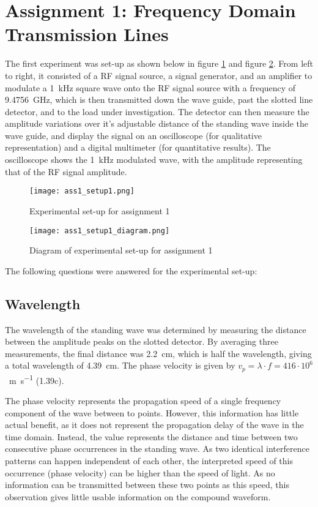 \section*{Assignment 1: Frequency Domain Transmission Lines}

The first experiment was set-up as shown below in figure \ref{fig:setup_1} and figure \ref{fig:setup_1_diagram}. From left to right, it consisted of a RF signal source, a signal generator, and an amplifier to modulate a \SI{1}{\kilo\hertz} square wave onto the RF signal source with a frequency of \SI{9.4756}{\giga\hertz}, which is then transmitted down the wave guide, past the slotted line detector, and to the load under investigation. The detector can then measure the amplitude variations over it's adjustable distance of the standing wave inside the wave guide, and display the signal on an oscilloscope (for qualitative representation) and a digital multimeter (for quantitative results). The oscilloscope shows the \SI{1}{\kilo\hertz} modulated wave, with the amplitude representing that of the RF signal amplitude.

\begin{figure}[H]
	\centering
	\texttt{[image: ass1\_setup1.png]}
	\caption{Experimental set-up for assignment 1 \cite[p.3]{lab_manual}}
	\label{fig:setup_1}
\end{figure}

\begin{figure}[H]
	\centering
	\texttt{[image: ass1\_setup1\_diagram.png]}
	\caption{Diagram of experimental set-up for assignment 1}
	\label{fig:setup_1_diagram}
\end{figure}

The following questions were answered for the experimental set-up:

\subsection*{Wavelength}
The wavelength of the standing wave was determined by measuring the distance between the amplitude peaks on the slotted detector. By averaging three measurements, the final distance was \SI{2.2}{\centi\meter}, which is half the wavelength, giving a total wavelength of \SI{4.39}{\centi\meter}. The phase velocity is given by $v_{p} = \lambda \cdot f = 416 \cdot 10^6$ \SI {}{\meter\per\second} (1.39c).

The phase velocity represents the propagation speed of a single frequency component of the wave between to points. However, this information has little actual benefit, as it does not represent the propagation delay of the wave in the time domain. Instead, the value represents the distance and time between two consecutive phase occurrences in the standing wave. As two identical interference patterns can happen independent of each other, the interpreted speed of this occurrence (phase velocity) can be higher than the speed of light. As no information can be transmitted between these two points as this speed, this observation gives little usable information on the compound waveform.

